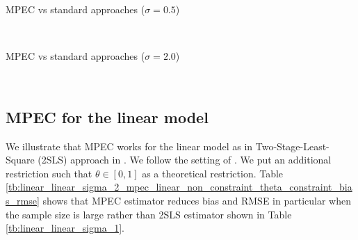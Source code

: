 \documentclass[11pt, a4paper]{article}
\begin{document}
\begin{table}[!htbp]
  \begin{center}
      \caption{MPEC vs standard approaches ($\sigma=0.5$)}
      \label{tb:loglinear_loglinear_sigma_0.5_separate_non_constraint_theta_constraint_bias_rmse} 
      \subfloat[MPEC]{}\\
    \subfloat[Simultaneous]{}
  \end{center}
  \footnotesize
\end{table} 


\begin{table}[!htbp]
  \begin{center}
      \caption{MPEC vs standard approaches ($\sigma=2.0$)}
      \label{tb:loglinear_loglinear_sigma_2_separate_non_constraint_theta_constraint_bias_rmse} 
      \subfloat[MPEC]{}\\
    \subfloat[Simultaneous]{}
  \end{center}
  \footnotesize
\end{table} 



\subsection{MPEC for the linear model}

We illustrate that MPEC works for the linear model as in Two-Stage-Least-Square (2SLS) approach in \cite{matsumura2023resolving}. 
We follow the setting of \cite{matsumura2023resolving}.
We put an additional restriction such that $\theta\in[0,1]$ as a theoretical restriction. 
Table \ref{tb:linear_linear_sigma_2_mpec_linear_non_constraint_theta_constraint_bias_rmse} shows that MPEC estimator reduces bias and RMSE in particular when the sample size is large rather than 2SLS estimator shown in Table \ref{tb:linear_linear_sigma_1}.
\end{document}
